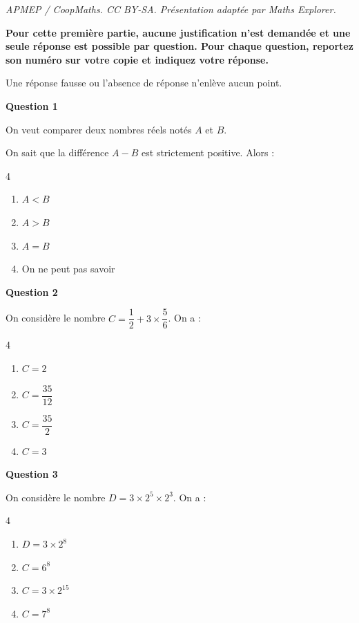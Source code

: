 \documentclass[10pt]{article}
\begin{document}
\noindent\textit{APMEP / CoopMaths. CC BY-SA. Présentation adaptée par Maths Explorer.}\par\medskip
\textbf{Pour cette première partie, aucune justification n'est demandée et une seule réponse est possible par question. Pour chaque question, reportez son numéro sur votre copie et indiquez votre réponse.}

	Une réponse fausse ou l'absence de réponse n'enlève aucun point.

\bigskip

	\textbf{Question 1}

On veut comparer deux nombres réels notés $A$ et $B$.

On sait que la différence $A - B$ est strictement positive. Alors :

\begin{multicols}{4}
\begin{enumerate}[label=\textbf{\alph* .}]
\item $A<B$
\item $A>B$
\item $A=B$
\item On ne peut pas savoir
\end{enumerate}
\end{multicols}

	\textbf{Question 2}

On considère le nombre $C=\dfrac{1}{2}+3\times\dfrac{5}{6}$. On a :

\begin{multicols}{4}
\begin{enumerate}[label=\textbf{\alph* .}]
\item $C = 2$
\item $C = \dfrac{35}{12}$
\item $C = \dfrac{35}{2}$
\item $C = 3$
\end{enumerate}
\end{multicols}

\textbf{Question 3}

On considère le nombre $D=3 \times 2^5 \times 2^3$. On a :

\begin{multicols}{4}
\begin{enumerate}[label=\textbf{\alph* .}]
\item $D = 3\times 2^{8}$
\item $C = 6^{8}$
\item $C = 3\times 2^{15}$
\item $C = 7^{8}$
\end{enumerate}
\end{multicols}
\end{document}
